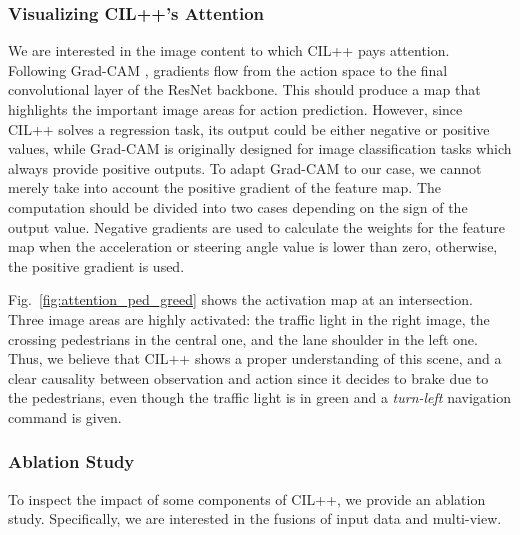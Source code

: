 \subsubsection{Visualizing CIL++'s Attention}
\label{sec:Visualization}
We are  interested in the image content to which CIL++ pays attention. 
Following Grad-CAM \cite{Selvaraju:2017}, gradients flow from the action space to the final convolutional layer of the ResNet backbone. 
This should produce a map that highlights the important image areas for action prediction. 
However, since CIL++ solves a regression task, its output could be either negative or positive values, while Grad-CAM is originally designed for image classification tasks which always provide positive outputs. 
To adapt Grad-CAM to our case, we cannot merely take into account the positive gradient of the feature map. 
The computation should be divided into two cases depending on the sign of the output value. 
Negative gradients are used to calculate the weights for the feature map when the acceleration or steering angle value is lower than zero, otherwise, the positive gradient is used.


Fig.~\ref{fig:attention_ped_greed} shows the activation map at an intersection. 
Three image areas are highly activated: the traffic light in the right image, the crossing pedestrians in the central one, and the lane shoulder in the left one. 
Thus, we believe that CIL++ shows a proper understanding of this scene, and a clear causality between observation and action since it decides to brake due to the pedestrians, even though the traffic light is in green and a \emph{turn-left} navigation command is given.


\subsubsection{Ablation Study}
\label{sec:Ablation Study}
To inspect the impact of some components of CIL++, we provide an ablation study. 
Specifically, we are interested in the fusions of input data and multi-view. 

